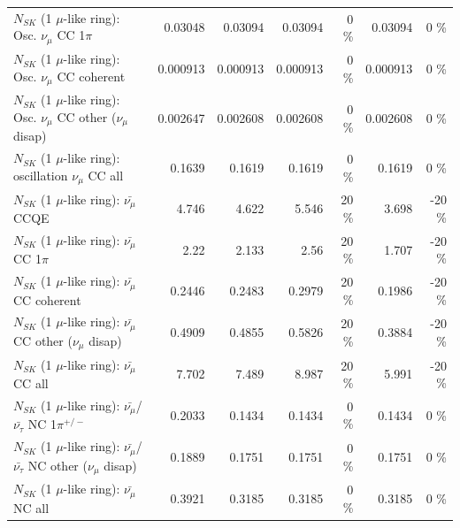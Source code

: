 \begin{table}
\begin{tabular}{| l | r | r | r  r | r  r |}
                          $N_{SK}$ (1 $\mu$-like ring): Osc. $\nu_\mu$ CC 1$\pi$ &         0.03048 &         0.03094 &         0.03094 &        0 \%  &         0.03094 &        0 \%  \\ 
                        $N_{SK}$ (1 $\mu$-like ring): Osc. $\nu_\mu$ CC coherent &        0.000913 &        0.000913 &        0.000913 &        0 \%  &        0.000913 &        0 \%  \\ 
         $N_{SK}$ (1 $\mu$-like ring): Osc. $\nu_\mu$ CC other ($\nu_\mu$ disap) &        0.002647 &        0.002608 &        0.002608 &        0 \%  &        0.002608 &        0 \%  \\ 
                      $N_{SK}$ (1 $\mu$-like ring): oscillation $\nu_\mu$ CC all &          0.1639 &          0.1619 &          0.1619 &        0 \%  &          0.1619 &        0 \%  \\ 
\hline
\hline
                              $N_{SK}$ (1 $\mu$-like ring): $\bar{\nu_\mu}$ CCQE &           4.746 &           4.622 &           5.546 &       20 \%  &           3.698 &      -20 \%  \\ 
                         $N_{SK}$ (1 $\mu$-like ring): $\bar{\nu_\mu}$ CC 1$\pi$ &            2.22 &           2.133 &            2.56 &       20 \%  &           1.707 &      -20 \%  \\ 
                       $N_{SK}$ (1 $\mu$-like ring): $\bar{\nu_\mu}$ CC coherent &          0.2446 &          0.2483 &          0.2979 &       20 \%  &          0.1986 &      -20 \%  \\ 
        $N_{SK}$ (1 $\mu$-like ring): $\bar{\nu_\mu}$ CC other ($\nu_\mu$ disap) &          0.4909 &          0.4855 &          0.5826 &       20 \%  &          0.3884 &      -20 \%  \\ 
                          $N_{SK}$ (1 $\mu$-like ring): $\bar{\nu_{\mu}}$ CC all &           7.702 &           7.489 &           8.987 &       20 \%  &           5.991 &      -20 \%  \\ 
\hline
  $N_{SK}$ (1 $\mu$-like ring): $\bar{\nu_\mu}$/$\bar{\nu_\tau}$ NC 1$\pi^{+/-}$ &          0.2033 &          0.1434 &          0.1434 &        0 \%  &          0.1434 &        0 \%  \\ 
$N_{SK}$ (1 $\mu$-like ring): $\bar{\nu_\mu}$/$\bar{\nu_\tau}$ NC other ($\nu_\mu$ disap) &          0.1889 &          0.1751 &          0.1751 &        0 \%  &          0.1751 &        0 \%  \\ 
                          $N_{SK}$ (1 $\mu$-like ring): $\bar{\nu_{\mu}}$ NC all &          0.3921 &          0.3185 &          0.3185 &        0 \%  &          0.3185 &        0 \%  \\ 

\end{tabular}
\end{table}
